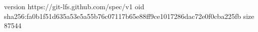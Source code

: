 version https://git-lfs.github.com/spec/v1
oid sha256:fa0b1f51d635a53e5a55b76c07117b65e88ff9ce1017286dac72e0f0cba225fb
size 87544

